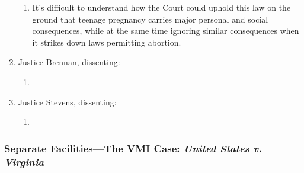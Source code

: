 \begin{enumerate}
    \begin{enumerate}
        \item It's difficult to understand how the Court could uphold this law 
        on the ground that teenage pregnancy carries major personal and social 
        consequences, while at the same time ignoring similar consequences 
        when it strikes down laws permitting abortion.
    \end{enumerate}
    \item Justice Brennan, dissenting:
    \begin{enumerate}
        \item %
    \end{enumerate}
    \item Justice Stevens, dissenting:
    \begin{enumerate}
        \item %
    \end{enumerate}
\end{enumerate}

\subsubsection{Separate Facilities---The VMI Case: \emph{United States v. 
Virginia}}

